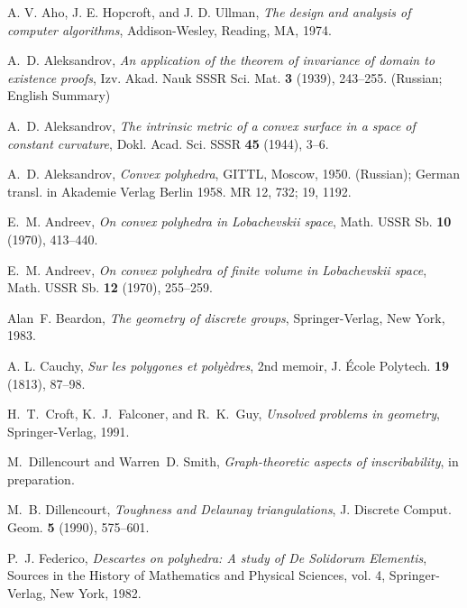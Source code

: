 
\begin{thebibliography}{99}

A. V. Aho, J. E. Hopcroft, and J. D. Ullman,
{\em The design and analysis of computer algorithms},
Addison-Wesley, Reading, MA, 1974.

A.~D. Aleksandrov,
{\it An application of the theorem of invariance of domain 
to existence
proofs\/},
Izv. Akad. Nauk SSSR Sci. Mat. {\bf3} (1939), 243--255.
(Russian; English Summary)

A.~D. Aleksandrov,
{\it The intrinsic metric of a convex surface in a space 
of constant
curvature\/},
Dokl. Acad. Sci. SSSR {\bf45} (1944), 3--6.

A.~D. Aleksandrov,
{\em Convex polyhedra\/},
GITTL, Moscow, 1950.
(Russian); German transl. in Akademie Verlag Berlin 1958. 
MR 12, 732; 19,
  1192.

E.~M. Andreev,
{\it On convex polyhedra in {L}obachevskii space\/},
Math. USSR Sb. {\bf10} (1970), 413--440.

E.~M. Andreev,
{\it On convex polyhedra of finite volume in 
{L}obachevskii space\/},
Math. USSR Sb. {\bf12} (1970), 255--259.

Alan~F. Beardon,
{\em The geometry of discrete groups\/},
Springer-Verlag, New York, 1983.

A. L. Cauchy,
{\it Sur les polygones et poly\`{e}dres\/}, 2nd memoir,
 J. \'Ecole Polytech. {\bf19}
 (1813), 87--98.

H.~T.~Croft, K.~J.~Falconer, and R.~K.~Guy,
{\em Unsolved problems in geometry},
Springer-Verlag, 1991.

M.~Dillencourt and Warren~D. Smith,
{\it Graph-theoretic aspects of inscribability\/},
in preparation.

M.~B. Dillencourt,
{\it Toughness and {Delaunay} triangulations\/},
J. Discrete Comput. Geom. {\bf5} 
(1990), 575--601.

P.~J. Federico,
{\em Descartes on polyhedra\/\RM: A study of De Solidorum 
Elementis\/},
Sources in the History of Mathematics and Physical
  Sciences,   vol. 4,
Springer-Verlag, New York, 1982.


\end{thebibliography}
